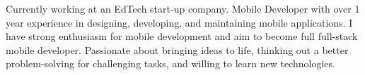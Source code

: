 

\begin{cvparagraph}

Currently working at an EdTech start-up company. Mobile Developer with over 1 year experience in designing, developing, and maintaining mobile applications. I have strong enthusiasm for mobile development and aim to become full full-stack mobile developer. Passionate about bringing ideas to life, thinking out a better problem-solving for challenging tasks, and willing to learn new technologies.
\end{cvparagraph}
